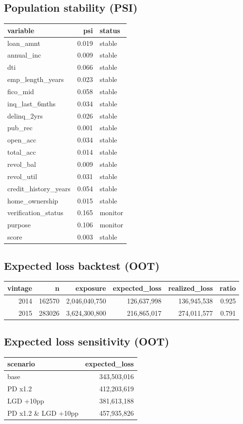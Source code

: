 \documentclass[11pt,a4paper]{article}
\begin{document}
\subsection*{Population stability (PSI)}
\begin{tabular}{lrl}
\toprule
variable & psi & status \\
\midrule
loan\_amnt & 0.019 & stable \\
annual\_inc & 0.009 & stable \\
dti & 0.066 & stable \\
emp\_length\_years & 0.023 & stable \\
fico\_mid & 0.058 & stable \\
inq\_last\_6mths & 0.034 & stable \\
delinq\_2yrs & 0.026 & stable \\
pub\_rec & 0.001 & stable \\
open\_acc & 0.034 & stable \\
total\_acc & 0.014 & stable \\
revol\_bal & 0.009 & stable \\
revol\_util & 0.031 & stable \\
credit\_history\_years & 0.054 & stable \\
home\_ownership & 0.015 & stable \\
verification\_status & 0.165 & monitor \\
purpose & 0.106 & monitor \\
score & 0.003 & stable \\
\bottomrule
\end{tabular}

\subsection*{Expected loss backtest (OOT)}
\begin{tabular}{rrrrrr}
\toprule
vintage & n & exposure & expected\_loss & realized\_loss & ratio \\
\midrule
2014 & 162570 & 2,046,040,750 & 126,637,998 & 136,945,538 & 0.925 \\
2015 & 283026 & 3,624,300,800 & 216,865,017 & 274,011,577 & 0.791 \\
\bottomrule
\end{tabular}

\subsection*{Expected loss sensitivity (OOT)}
\begin{tabular}{lr}
\toprule
scenario & expected\_loss \\
\midrule
base & 343,503,016 \\
PD x1.2 & 412,203,619 \\
LGD +10pp & 381,613,188 \\
PD x1.2 \& LGD +10pp & 457,935,826 \\
\bottomrule
\end{tabular}
\end{document}

